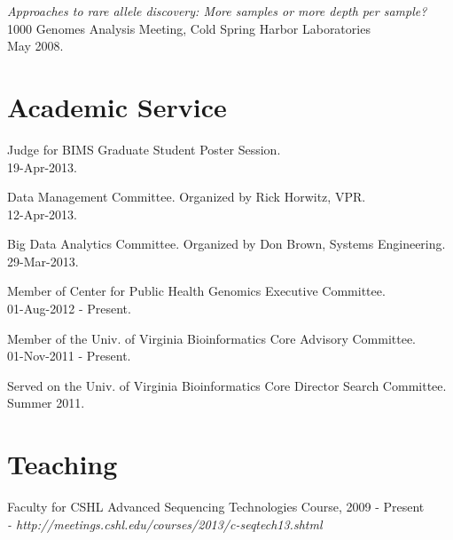 \documentclass[margin,line]{cv}
\begin{document}
\begin{resume}
    \vspace{-2mm}
    \textit{Approaches to rare allele discovery: More samples or more depth per sample? } \\
    1000 Genomes Analysis Meeting, Cold Spring Harbor Laboratories \\
    May 2008.
    
    \section{\mysidestyle Academic Service}

    Judge for BIMS Graduate Student Poster Session. \\
    19-Apr-2013.

    Data Management Committee. Organized by Rick Horwitz, VPR.\\
    12-Apr-2013.

    Big Data Analytics Committee. Organized by Don Brown, Systems Engineering.\\
    29-Mar-2013.

    Member of Center for Public Health Genomics Executive Committee.\\
    01-Aug-2012 - Present.
    
    \vspace{-2mm}
    Member of the Univ. of Virginia Bioinformatics Core Advisory Committee.\\
    01-Nov-2011 - Present.
    
    \vspace{-2mm}
    Served on the Univ. of Virginia Bioinformatics Core Director Search Committee. \\
    Summer 2011.



    \section{\mysidestyle Teaching}


    Faculty for CSHL Advanced Sequencing Technologies Course, 2009 - Present\\
    \emph{- http://meetings.cshl.edu/courses/2013/c-seqtech13.shtml}
    

\end{resume}
\end{document}
